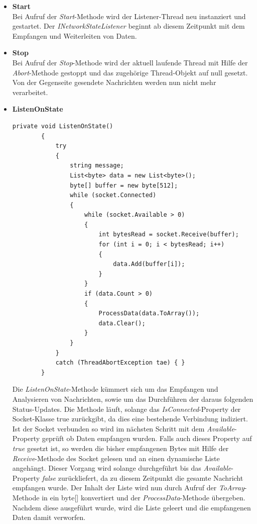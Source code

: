 \begin{itemize}
\item \textbf{Start}\\
Bei Aufruf der \textit{Start}-Methode wird der Listener-Thread neu instanziert und gestartet. Der  \textit{INetworkStateListener} beginnt ab diesem Zeitpunkt mit dem Empfangen und Weiterleiten von Daten. 
\item \textbf{Stop}\\
Bei Aufruf der \textit{Stop}-Methode wird der aktuell laufende Thread mit Hilfe der  \textit{Abort}-Methode gestoppt und das zugehörige Thread-Objekt auf null gesetzt. Von der Gegenseite gesendete Nachrichten werden nun nicht mehr verarbeitet.
\item \textbf{ListenOnState}\\
\begin{lstlisting}[language = CSharp, captionpos=b, caption={Die ListenOnState-Methode}]
private void ListenOnState()
        {
            try
            {
                string message;
                List<byte> data = new List<byte>();
                byte[] buffer = new byte[512];
                while (socket.Connected)
                {
                    while (socket.Available > 0)
                    {
                        int bytesRead = socket.Receive(buffer);
                        for (int i = 0; i < bytesRead; i++)
                        {
                            data.Add(buffer[i]);
                        }
                    }
                    if (data.Count > 0)
                    {
                        ProcessData(data.ToArray());                        
                        data.Clear();
                    }
                }
            }
            catch (ThreadAbortException tae) { }
        }       
\end{lstlisting}
Die \textit{ListenOnState}-Methode kümmert sich um das Empfangen und Analysieren von Nachrichten, sowie um das Durchführen der daraus folgenden Status-Updates. 
Die Methode läuft, solange das \textit{IsConnected}-Property der Socket-Klasse true zurückgibt, da dies eine bestehende Verbindung indiziert. Ist der Socket verbunden so wird im nächsten Schritt mit dem \textit{Available}-Property geprüft ob Daten empfangen wurden. Falls auch dieses Property auf \textit{true} gesetzt ist, so werden die bisher empfangenen Bytes mit Hilfe der \textit{Receive}-Methode des Socket gelesen und an einen dynamische Liste angehängt. 
Dieser Vorgang wird solange durchgeführt bis das \textit{Available}-Property \textit{false} zurückliefert, da zu diesem Zeitpunkt die gesamte Nachricht empfangen wurde. Der Inhalt der Liste wird nun durch Aufruf der  \textit{ToArray}-Methode in ein byte[] konvertiert und der \textit{ProcessData}-Methode übergeben. Nachdem diese ausgeführt wurde, wird die Liste geleert und die empfangenen Daten damit verworfen.



\end{itemize}
